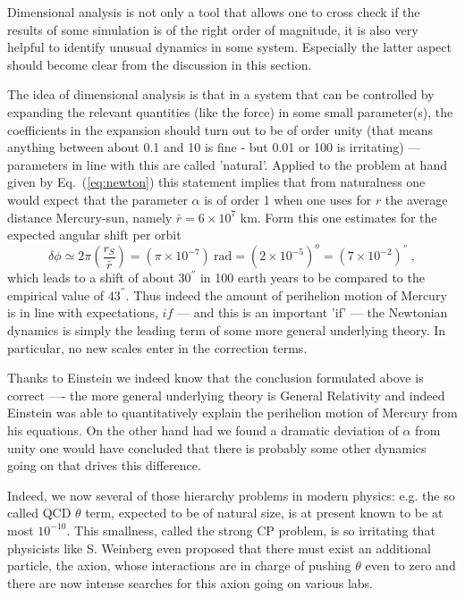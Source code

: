 \documentclass[12pt]{iopart}
\begin{document}
Dimensional analysis is not only a tool that allows one to cross check if the results of some simulation is
of the right order of magnitude, it is also very helpful to identify unusual dynamics in some system.
Especially the latter aspect should become clear from the discussion in this section.

The idea of dimensional analysis is that in a system that can be controlled by expanding the relevant quantities
(like the force) in some small parameter(s), the coefficients in the expansion should turn out to be of order unity (that
means anything between about 0.1 and 10 is fine - but 0.01 or 100 is irritating) --- parameters in line with this
are called 'natural'. Applied to the problem at hand
given by Eq.~(\ref{eq:newton}) this statement implies that from naturalness one would expect that 
the parameter $\alpha$ is of order 1 when one uses
for $r$ the average distance Mercury-sun, namely $\bar r=6\times 10^7$ km.
Form this one estimates for the expected angular shift per orbit
\begin{equation}
\delta \phi \simeq 2\pi\left(\frac{r_S}{\bar r}\right) = (\pi \times 10^{-7}) \ \mbox{rad} = (2\times 10^{-5})^o = (7\times 10^{-2}) ^{''} \ ,
\end{equation}
which leads to a shift of  about $30^{''}$ in 100 earth years to be compared to the empirical value of $43^{''}$.
 Thus indeed the
amount of perihelion motion of Mercury is in line with expectations, $if$ --- and this is an important 'if' ---
the Newtonian dynamics is simply the leading term of some more general underlying theory. In particular,
no new scales enter in the correction terms.

Thanks to Einstein we indeed know that the conclusion formulated above is correct ---- the more general underlying
theory is General Relativity and indeed Einstein was able to quantitatively explain the perihelion motion of Mercury
from his equations. 
On the other hand had we found a dramatic deviation of $\alpha$ from unity one would have concluded that 
there is probably some other dynamics going on that drives this difference.

Indeed, we now several of those hierarchy problems in modern physics: e.g. the so called QCD $\theta$ term,
expected to be of natural size, is at present known to be at most $10^{-10}$. This smallness, called the
strong CP problem, is so irritating that physicists like S. Weinberg even proposed that there must exist an
additional particle, the axion, whose interactions are in charge of pushing $\theta$ even to zero and there
are now intense searches for this axion going on various labs.
\end{document}
